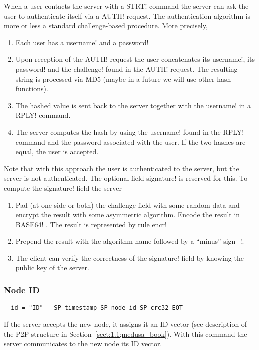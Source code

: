 \documentclass{medusabook}
\begin{document}
When a user contacts the server with a \ttt STRT! command the server
can ask the user to authenticate itself via a \ttt AUTH! request.  The
authentication algorithm is more or less a standard challenge-based
procedure.  More precisely,
  \begin{enumerate}
    \item
      Each user has a \ttt username! and a \ttt password!
    \item
      Upon reception of the \ttt AUTH! request the user concatenates
      its \ttt username!, its \ttt password! and the \ttt challenge!
      found in the \ttt AUTH! request.  The resulting string is
      processed via MD5 (maybe in a future we will use other hash
      functions). 
   \item
      The hashed value is sent back to the server together with the
      \ttt username! in a \ttt RPLY! command.
   \item
      The server computes the hash by using the \ttt username! found
      in the \ttt RPLY! command and the password associated with the
      user.  If the two hashes are equal, the user is accepted.
  \end{enumerate}
  Note that with this approach the user is authenticated to the
  server, but the server is not authenticated.  The optional field
  \ttt signature! is reserved for this.  To compute the \ttt
  signature! field the server
  \begin{enumerate}
    \item
       Pad (at one side or both) the challenge field with some random
       data and encrypt the result with some asymmetric algorithm.
       Encode the result in \ttt BASE64! \cite{rfc4648}.  The result
       is represented by rule \ttt encr!
    \item
       Prepend the result with the algorithm name followed by a
       ``minus'' sign \ttt-!.
    \item
      The client can verify the correctness of the \ttt signature!
      field by knowing the public key of the server.
  \end{enumerate}

\subsubsection{Node ID}
\label{subsub:1.3.1.3;medusa_book}

\begin{verbatim}
  id = "ID"   SP timestamp SP node-id SP crc32 EOT  
\end{verbatim}
If the server accepts the new node, it assigns it an ID
  vector (see description of the P2P structure in
  Section~\ref{sect:1.1;medusa_book}).  With this command the server
  communicates to the new node its ID vector.
\end{document}
